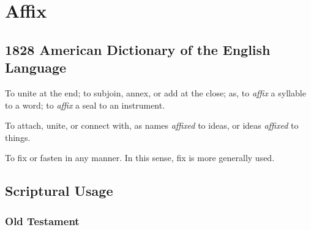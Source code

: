 \section{Affix}
	\label{AFFIX}
	

\subsection{1828 American Dictionary of the English Language} %
	\label{AFFIX-1828}

	\begin{compactitem}
		\item[1] To unite at the end; to subjoin, annex, or add at the close; as, to \textit{affix} a syllable to a word; to \textit{affix} a seal to an instrument.
		\item[2] To attach, unite, or connect with, as names \textit{affixed} to ideas, or ideas \textit{affixed} to things.
		\item[3] To fix or fasten in any manner. In this sense, fix is more generally used.
	\end{compactitem}



\subsection{Scriptural Usage} %
	\label{AFFIX-SCRIPTURES}

	\subsubsection{Old Testament} %
		\label{AFFIX-OT}
	
